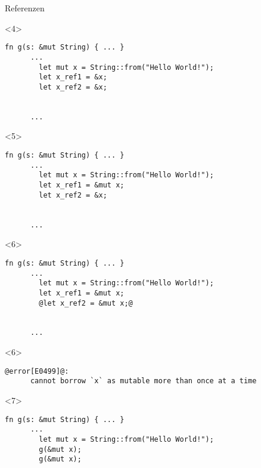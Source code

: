 \begin{frame}[fragile]{Referenzen}

  \begin{onlyenv}<4> {
    \begin{lstlisting}[frame=single,style=base]
      fn g(s: &mut String) { ... }
      ...
        let mut x = String::from("Hello World!");
        let x_ref1 = &x;
        let x_ref2 = &x;


      ...\end{lstlisting}
  }
  \end{onlyenv}


  \begin{onlyenv}<5> {
    \begin{lstlisting}[frame=single,style=base]
      fn g(s: &mut String) { ... }
      ...
        let mut x = String::from("Hello World!");
        let x_ref1 = &mut x;
        let x_ref2 = &x;


      ...\end{lstlisting}
  }
  \end{onlyenv}


  \begin{onlyenv}<6> {
    \begin{lstlisting}[frame=single,style=base]
      fn g(s: &mut String) { ... }
      ...
        let mut x = String::from("Hello World!");
        let x_ref1 = &mut x;
        @let x_ref2 = &mut x;@


      ...\end{lstlisting}
  }
  \end{onlyenv}

  \begin{onlyenv}<6> {
    \begin{lstlisting}[frame=single,style=base]
      @error[E0499]@:
      cannot borrow `x` as mutable more than once at a time\end{lstlisting}
  }
  \end{onlyenv}


  \begin{onlyenv}<7> {
    \begin{lstlisting}[frame=single,style=base]
      fn g(s: &mut String) { ... }
      ...
        let mut x = String::from("Hello World!");
        g(&mut x);
        g(&mut x);



\end{lstlisting}}
\end{onlyenv}
\end{frame}
